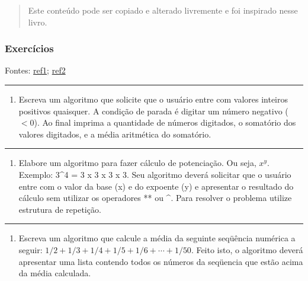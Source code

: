 \documentclass[12pt,a4paper]{article}
\providecommand{\tightlist}{%
      \setlength{\itemsep}{0pt}\setlength{\parskip}{0pt}}
\begin{document}
\begin{quote}
Este conteúdo pode ser copiado e alterado livremente e foi inspirado
nesse livro.
\end{quote}

    \hypertarget{exercuxedcios}{%
\subsubsection{Exercícios}\label{exercuxedcios}}

Fontes:
\href{https://docente.ifrn.edu.br/jonathanpereira/disciplinas/algoritmos/estruturas-de-repeticao/view}{ref1};
\href{https://www.inf.pucrs.br/~pinho/LaproI/Exercicios/Repeticao/Lista1.htm}{ref2}

    \begin{center}\rule{0.5\linewidth}{0.5pt}\end{center}

\begin{enumerate}
\def\labelenumi{\arabic{enumi}.}
\tightlist
\item
  Escreva um algoritmo que solicite que o usuário entre com valores
  inteiros positivos quaisquer. A condição de parada é digitar um número
  negativo (\(<0\)). Ao final imprima a quantidade de números digitados,
  o somatório dos valores digitados, e a média aritmética do somatório.
\end{enumerate}

    \begin{center}\rule{0.5\linewidth}{0.5pt}\end{center}

\begin{enumerate}
\def\labelenumi{\arabic{enumi}.}
\setcounter{enumi}{1}
\tightlist
\item
  Elabore um algoritmo para fazer cálculo de potenciação. Ou seja,
  \(x^y\). Exemplo: 3\^{}4 = 3 x 3 x 3 x 3. Seu algoritmo deverá
  solicitar que o usuário entre com o valor da base (x) e do expoente
  (y) e apresentar o resultado do cálculo sem utilizar os operadores **
  ou \^{}. Para resolver o problema utilize estrutura de repetição.
\end{enumerate}

    \begin{center}\rule{0.5\linewidth}{0.5pt}\end{center}

\begin{enumerate}
\def\labelenumi{\arabic{enumi}.}
\setcounter{enumi}{2}
\tightlist
\item
  Escreva um algoritmo que calcule a média da seguinte seqüência
  numérica a seguir: \(1/2 + 1/3 + 1/4 + 1/5 + 1/6 + \cdots + 1/50\).
  Feito isto, o algoritmo deverá apresentar uma lista contendo todos os
  números da seqüencia que estão acima da média calculada.
\end{enumerate}
\end{document}

